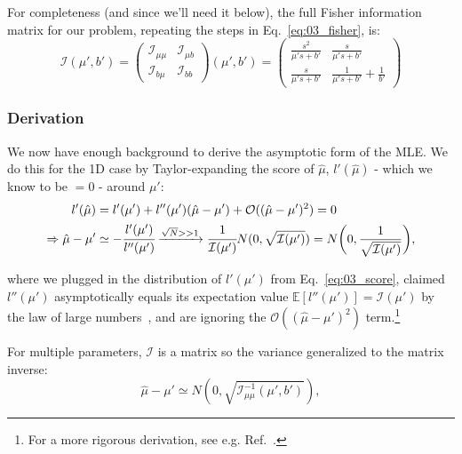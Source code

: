 For completeness (and since we'll need it below), the full Fisher information matrix for our problem, repeating the steps in Eq.~\ref{eq:03_fisher}, is:
\begin{equation}
    \mathcal I(\mu', b')
    = \begin{pmatrix}\mathcal I_{\mu\mu} & \mathcal I_{\mu b} \\ \mathcal I_{b\mu} & \mathcal I_{bb}\end{pmatrix}(\mu', b')
    = \begin{pmatrix}
    \frac{s^2}{\mu' s + b'} & \frac{s}{\mu' s + b'} \\ \frac{s}{\mu' s + b'} & \frac{1}{\mu' s + b'} + \frac{1}{b'}
    \end{pmatrix}
\label{eq:03_fishermatrix}
\end{equation}


\subsubsection{Derivation}
\label{sec:03_pmle_derivation}

We now have enough background to derive the asymptotic form of the MLE. 
We do this for the 1D case by Taylor-expanding the score of $\hat \mu$, $l'(\hat\mu)$ - which we know to be $ = 0$ - around $\mu'$:
\begin{align}
l'(\hat\mu) &= l'(\mu') + l''(\mu')(\hat\mu - \mu') + \mathcal O((\hat\mu - \mu')^2) = 0 \\
\Rightarrow \hat\mu - \mu' &\simeq - \cfrac{l'(\mu')}{l''(\mu')} \xrightarrow{\sqrt{N} >> 1} \cfrac{1}{\mathcal I(\mu')}N(0, \sqrt{\mathcal I(\mu')}) = N\bigg(0, \frac{1}{\sqrt{\mathcal I(\mu')}}\bigg),
\label{eq:03_taylorl}
\end{align}

where we plugged in the distribution of $l'(\mu')$ from Eq.~\ref{eq:03_score}, claimed $l''(\mu')$ asymptotically equals its expectation value $\mathbb E[l''(\mu')] = \mathcal I(\mu')$ by the law of large numbers~\cite{enwiki:1256071749}, and are ignoring the $\mathcal O((\hat\mu - \mu')^2)$ term.\footnote{For a more rigorous derivation, see e.g. Ref.~\cite{gundersen_asymptotic_2019}.}

For multiple parameters, $\mathcal I$ is a matrix so the variance generalized to the matrix inverse:
\begin{equation}
    \hat\mu - \mu' \simeq N(0, \sqrt{\mathcal I^{-1}_{\mu\mu}(\mu', b')}),
\label{eq:03_asym_std_fisher}
\end{equation}

